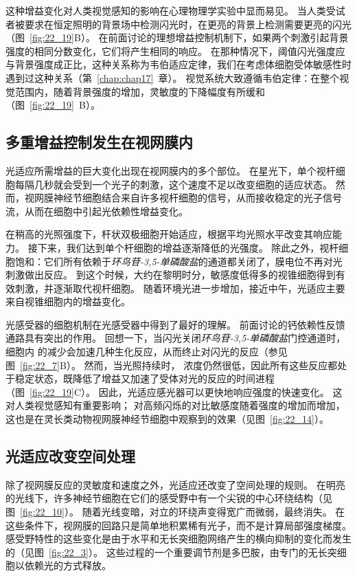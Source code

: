 这种增益变化对人类视觉感知的影响在心理物理学实验中显而易见。
当人类受试者被要求在恒定照明的背景场中检测闪光时，在更亮的背景上检测需要更亮的闪光（图~\ref{fig:22_19}B）。
在前面讨论的理想增益控制机制下，如果两个刺激引起背景强度的相同分数变化，它们将产生相同的响应。
在那种情况下，阈值闪光强度应与背景强度成正比，这种关系称为韦伯适应定律，我们在考虑体细胞受体敏感性时遇到过这种关系（第~\ref{chap:chap17}~章）。
视觉系统大致遵循韦伯定律：在整个视觉范围内，随着背景强度的增加，灵敏度的下降幅度有所缓和（图~\ref{fig:22_19}~B）。



\subsection{多重增益控制发生在视网膜内}

光适应所需增益的巨大变化出现在视网膜内的多个部位。 
在星光下，单个视杆细胞每隔几秒就会受到一个光子的刺激，这个速度不足以改变细胞的适应状态。
然而，视网膜神经节细胞结合来自许多视杆细胞的信号，从而接收稳定的光子信号流，从而在细胞中引起光依赖性增益变化。


在稍高的光照强度下，杆状双极细胞开始适应，根据平均光照水平改变其响应能力。
接下来，我们达到单个杆细胞的增益逐渐降低的光强度。 
除此之外，视杆细胞饱和：它们所有依赖于\textit{环鸟苷-3,5-单磷酸盐}的通道都关闭了，膜电位不再对光刺激做出反应。
到这个时候，大约在黎明时分，敏感度低得多的视锥细胞得到有效刺激，并逐渐取代视杆细胞。
随着环境光进一步增加，接近中午，光适应主要来自视锥细胞内的增益变化。


光感受器的细胞机制在光感受器中得到了最好的理解。
前面讨论的钙依赖性反馈通路具有突出的作用。
回想一下，当闪光关闭\textit{环鸟苷-3,5-单磷酸盐}门控通道时，细胞内  的减少会加速几种生化反应，从而终止对闪光的反应（参见图~\ref{fig:22_7}B）。
然而，当光照持续时， 浓度仍然很低，因此所有这些反应都处于稳定状态，既降低了增益又加速了受体对光的反应的时间进程（图~\ref{fig:22_19}C）。
因此，光适应感光器可以更快地响应强度的快速变化。
这对人类视觉感知有重要影响；
对高频闪烁的对比敏感度随着强度的增加而增加，这也是在灵长类动物视网膜神经节细胞中观察到的效果（见图~\ref{fig:22_14}）。



\subsection{光适应改变空间处理}

除了视网膜反应的灵敏度和速度之外，光适应还改变了空间处理的规则。
在明亮的光线下，许多神经节细胞在它们的感受野中有一个尖锐的中心环绕结构（见图~\ref{fig:22_10}）。 
随着光线变暗，对立的环绕声变得宽广而微弱，最终消失。
在这些条件下，视网膜的回路只是简单地积累稀有光子，而不是计算局部强度梯度。
感受野特性的这些变化是由于水平和无长突细胞网络产生的横向抑制的变化而发生的（见图~\ref{fig:22_3}）。
这些过程的一个重要调节剂是多巴胺，由专门的无长突细胞以依赖光的方式释放。


